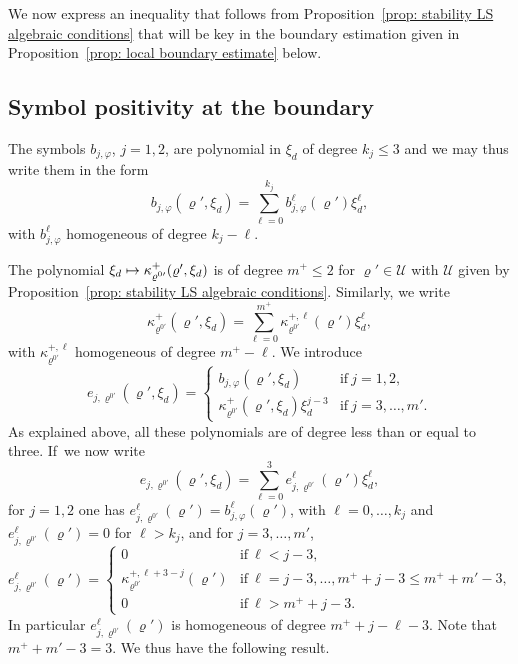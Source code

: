 \documentclass[10pt]{amsart}
\newcommand\mto{\mathchoice{\longmapsto}{\mapsto}{\mapsto}{\mapsto}}
\theoremstyle{plain}
\theoremstyle{definition}
\let\k\kappa
\let\y\varrho
\newcommand{\U}{\mathscr U}
\begin{document}
We now express an inequality that follows from Proposition~\ref{prop:
stability LS algebraic conditions} that will be key in the boundary
estimation given in Proposition~\ref{prop: local boundary
estimate} below.

\subsection{Symbol positivity at the boundary}
\label{sec: Symbol postivity at the boundary}
The symbols $b_{j,\varphi}$, $j=1,2$, are polynomial in $\xi_d$ of
degree $k_j \leq 3$ and we
may thus write them in the form
\begin{equation*}
b_{j,\varphi}(\y',\xi_d)=\sum_{\ell=0}^{k_j}b_{j,\varphi}^\ell (\y')\xi_d^\ell,
\end{equation*}
with $b_{j,\varphi}^\ell$ homogeneous of degree $k_j-\ell$.

The polynomial $\xi_d \mto \k^+_{\y^{0\prime}} (\y',\xi_d)$ is of
degree $m^+ \leq 2$ for $\y'\in \U$ with $\U$ given by Proposition~\ref{prop: stability LS algebraic conditions}.
Similarly, we write
\begin{equation*}
\k^+_{\y^{0\prime}} (\y',\xi_d)=\sum_{\ell=0}^{m^+}\k^{+,\ell}_{\y^{0\prime}} (\y')\xi_d^\ell,
\end{equation*}
with $\k^{+,\ell}_{\y^{0\prime}}$ homogeneous of degree $m^+-\ell$.
We introduce
\begin{equation*}
e_{j, \y^{0\prime}} (\y', \xi_d) =
\begin{cases}
b_{j,\varphi}(\y',\xi_d) & \text{if} \ j=1,2,\\
\k^+_{\y^{0\prime}} (\y',\xi_d) \xi_d^{j-3} & \text{if} \ j=3,\dots, m'.
\end{cases}
\end{equation*}
As explained above, all these polynomials are of degree less than or
equal to three.
If~we now write
\begin{equation*}
e_{j, \y^{0\prime}} (\y', \xi_d)
= \sum_{\ell=0}^{3} e_{j,
\y^{0\prime}}^\ell (\y') \xi_d^\ell,
\end{equation*}
for $j=1,2$ one has $e_{j, \y^{0\prime}}^\ell (\y') =
b_{j,\varphi}^\ell (\y')$, with $\ell =0, \dots, k_j$ and $e_{j,
\y^{0\prime}}^\ell (\y') =0$ for $\ell > k_j$, and for
$j=3,\dots,m'$,
\begin{equation*}
e_{j, \y^{0\prime}}^\ell (\y') =
\begin{cases}
0 & \text{if} \ \ell < j-3,\\
\k^{+,\ell+3-j}_{\y^{0\prime}} (\y') & \text{if} \ \ell=j-3,\dots,
m^+ + j- 3\leq m^+ + m' -3,\\
0 & \text{if} \ \ell > m^+ + j- 3.
\end{cases}
\end{equation*}
In particular $e_{j, \y^{0\prime}}^\ell\! (\y')$ is homogeneous of
degree $m^+ \!+j - \ell -3$. Note that~\hbox{$m^+ \!+\! m' \!-\!3\!=\!3$}.
We thus have the following result.
\end{document}
